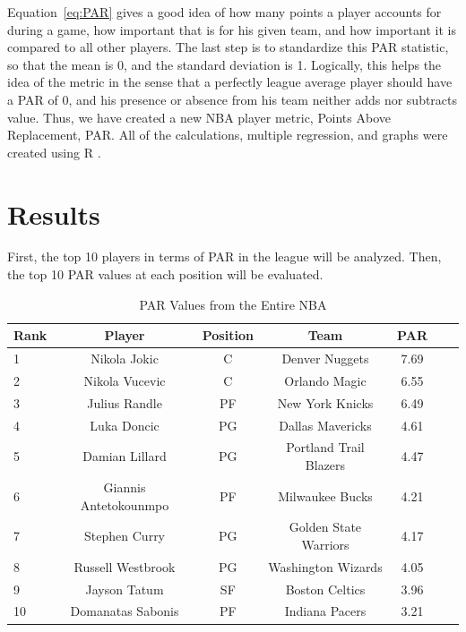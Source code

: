 \documentclass[12pt]{article}
\begin{document}
Equation~\ref{eq:PAR} gives a good idea of how many points a player 
accounts for 
during a 
game, how important that is for 
his given team, and how important it is compared to all other players. The 
last step is to standardize this 
PAR statistic, so that the mean is 0, and the standard deviation is 1. 
Logically, this helps the idea of the 
metric in the sense that a perfectly league average player should have a 
PAR of 0, and his presence or 
absence from his team neither adds nor subtracts value. Thus, we have 
created a new NBA player metric, 
Points Above Replacement, PAR. All of the calculations, multiple 
regression, and graphs were created using R \citep{R}.
 
 
\section{Results}
First, the top 10 players in terms of PAR in the league will be analyzed. Then, the top 10 PAR values at each position will be evaluated.

\begin{table}[H]
  \caption{PAR Values from the Entire NBA}
  \label{tab:NBAtable}
\centering
\begin{tabular}[t]{lcccccc}
  \toprule
  Rank & Player & Position & Team & PAR\\
  \midrule
 1 & Nikola Jokic & C & Denver Nuggets & 7.69\\
 2 & Nikola Vucevic & C & Orlando Magic & 6.55\\
 3 & Julius Randle & PF & New York Knicks & 6.49\\
 4 & Luka Doncic & PG & Dallas Mavericks & 4.61\\
 5 & Damian Lillard & PG & Portland Trail Blazers & 4.47\\
 6 & Giannis Antetokounmpo & PF & Milwaukee Bucks & 4.21\\
 7 & Stephen Curry & PG & Golden State Warriors & 4.17\\
 8 & Russell Westbrook & PG & Washington Wizards & 4.05\\
 9 & Jayson Tatum & SF & Boston Celtics & 3.96\\
 10 & Domanatas Sabonis & PF & Indiana Pacers & 3.21\\
 \bottomrule
\end{tabular}
\end{table}
\end{document}
